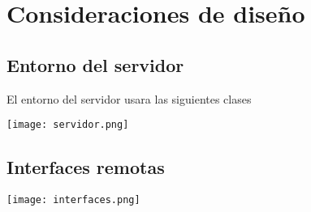 \chapter{Consideraciones de diseño}

\section{Entorno del servidor}

El entorno del servidor usara las siguientes clases

\centerline{\texttt{[image: servidor.png]}}

\section{Interfaces remotas}


\texttt{[image: interfaces.png]}
